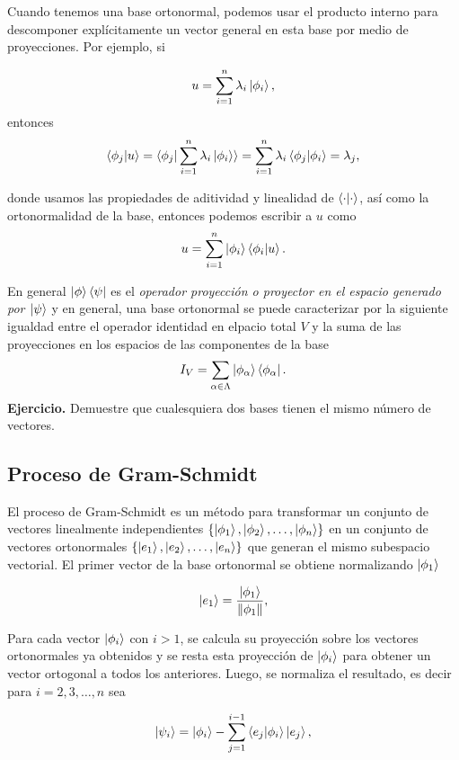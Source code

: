 \documentclass[letterpaper]{book}
\newcommand{\exe}{{\noindent \sc \textbf{Ejercicio. }}}
\begin{document}
Cuando tenemos una base ortonormal, podemos usar el producto interno para descomponer explícitamente un vector general en esta base por medio de proyecciones. Por ejemplo, si

\[
u = \sum_{i=1}^n \lambda_i \ket{\phi_i},
\]
entonces
\[
\braket{\phi_j| u} = \braket{\phi_j| \sum_{i=1}^n \lambda_i \ket{\phi_i}} = \sum_{i=1}^n \lambda_i\braket{\phi_j |\phi_i} = \lambda_j,
\]

donde usamos las propiedades de aditividad y linealidad de \(\braket{\cdot|\cdot}\), así como la ortonormalidad de la base, entonces podemos escribir a \(u\) como
\begin{equation}
u = \sum_{i=1}^n \ket{\phi_i}\braket{\phi_i|u}.
\end{equation}

En general \(\ket{\phi}\bra{\psi}\) es el \emph{operador proyección o proyector en el espacio generado por \(\ket{\psi}\)} y en general, una base ortonormal se puede caracterizar por la siguiente igualdad entre el operador identidad en elpacio total \(V\) y la suma de las proyecciones en los espacios de las componentes de la base
\begin{equation}
I_{V}=\sum_{\alpha\in\Lambda}\ket{\phi_{\alpha}}\bra{\phi_{\alpha}}.
\end{equation}
\exe Demuestre que cualesquiera dos bases tienen el mismo número de vectores.

\subsection{Proceso de Gram-Schmidt}

\noindent El proceso de Gram-Schmidt es un método para transformar un conjunto de vectores linealmente independientes \(\{\ket{\phi_1}, \ket{\phi_2}, \dots, \ket{\phi_n}\}\) en un conjunto de vectores ortonormales \(\{\ket{e_1}, \ket{e_2}, \dots, \ket{e_n}\}\) que generan el mismo subespacio vectorial. El primer vector de la base ortonormal se obtiene normalizando \(\ket{\phi_1}\)

\[
\ket{e_1} = \frac{\ket{\phi_1}}{\Vert\phi_1\Vert},
\]

Para cada vector \(\ket{\phi_i}\) con \(i > 1\), se calcula su proyección sobre los vectores ortonormales ya obtenidos y se resta esta proyección de \(\ket{\phi_i}\) para obtener un vector ortogonal a todos los anteriores. Luego, se normaliza el resultado, es decir para \(i = 2, 3, \dots, n\) sea

\[
\ket{\psi_i} = \ket{\phi_i} - \sum_{j=1}^{i-1} \braket{e_j | \phi_i} \ket{e_j},
\]
\end{document}
